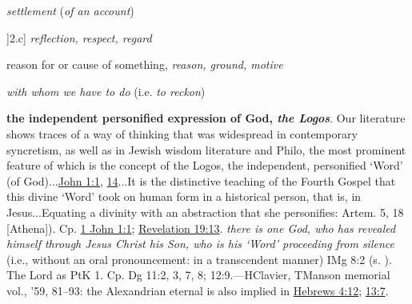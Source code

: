 \begin{compactdesc}
\begin{compactitem}
							\item[2.b] \textit{settlement} (\textit{of an account})
							\item]2.c] \textit{reflection, respect, regard}
							\item[2.d] reason for or cause of something, \textit{reason, ground, motive}
							\item[2.e]  \textit{with whom we have to do} (i.e. \textit{to reckon})
							\item[3] \textbf{the independent personified expression of God, \textit{the Logos}}. Our literature shows traces of a way of thinking that was widespread in contemporary syncretism, as well as in Jewish wisdom literature and Philo, the most prominent feature of which is the concept of the Logos, the independent, personified `Word' (of God)...\hyperref[JOHN-1-1]{John 1:1}, \hyperref[JOHN-1-14]{14}...It is the distinctive teaching of the Fourth Gospel that this divine `Word' took on human form in a historical person, that is, in Jesus...Equating a divinity with an abstraction that she personifies: Artem. 5, 18  [Athena]). Cp. \hyperref[1JOHN-1-1]{1 John 1:1}; \hyperref[REVELATIONNT-19-13]{Revelation 19:13}.  \textit{there is one God, who has revealed himself through Jesus Christ his Son, who is his `Word' proceeding from silence} (i.e., without an oral pronouncement: in a transcendent manner) IMg 8:2 (s. ). The Lord as  PtK 1. Cp. Dg 11:2, 3, 7, 8; 12:9.---HClavier, TManson memorial vol., '59, 81--93: the Alexandrian eternal  is also implied in \hyperref[HEBREWS-4-12]{Hebrews 4:12}; \hyperref[HEBREWS-13-7]{13:7}.
						\end{compactitem}
					\item[LSJ , PDF ] \textbf{}

\end{compactdesc}

